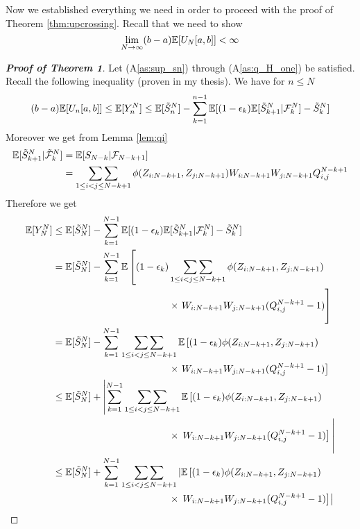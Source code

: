 %
\noindent Now we established everything we need in order to proceed with the proof of Theorem \ref{thm:upcrossing}. Recall that we need to show 
\begin{equation*}
	\lim\limits_{N\to\infty}(b-a) \mathbb{E}[U_N[a,b]] <\infty\nonumber
\end{equation*}
%
\begin{proof}[\textbf{Proof of Theorem 1}]
	Let (A\ref{as:sup_sn}) through (A\ref{as:q_H_one}) be satisfied. Recall the following inequality (proven in my thesis). We have for $n\leq N$
	$$(b-a) \mathbb{E}[U_n[a,b]] \leq \mathbb{E}[Y_n^N] \leq \mathbb{E}[\tilde{S}_{n}^N] - \sum_{k=1}^{n-1} \mathbb{E}[(1-\epsilon_k) \mathbb{E}[\tilde{S}_{k+1}^N | \mathcal{F}_k^N] - \tilde{S}_{k}^N]$$
	Moreover we get from Lemma \ref{lem:qi}
	\begin{align*}
	\mathbb{E}[\tilde{S}_{k+1}^N|\tilde{\mathcal{F}}_{k}^N] &= \mathbb{E}[S_{N-k} | \mathcal{F}_{N-k+1}]\\
	&= \mathop{\sum\sum}\limits_{1\leq i<j\leq N-k+1} \phi(Z_{i:N-k+1}, Z_{j:N-k+1}) W_{i:N-k+1} W_{j:N-k+1} Q_{i,j}^{N-k+1}
	\end{align*}
	Therefore we get
	\begin{align*}
		\E[Y_N^N] &\leq \E[\StN{N}] - \sum_{k=1}^{N-1} \E[(1-\epsilon_k) \E[\StN{k+1} | \F_k^N] - \StN{k} ]\\
		&=  \E[\StN{N}] - \sum_{k=1}^{N-1} \E\left[(1-\epsilon_k) \doublesum\limits_{1\leq i<j\leq N-k+1} \phi(Z_{i:N-k+1}, Z_{j:N-k+1}) \right. \\
		&\qquad\qquad\qquad\qquad\qquad\qquad \times \left. W_{i:N-k+1} W_{j:N-k+1}(Q_{i,j}^{N-k+1} - 1) \vphantom{\doublesum\limits_{1\leq i<j\leq N-k+1}}\right]\\
		&=  \E[\StN{N}] - \sum_{k=1}^{N-1} \doublesum\limits_{1\leq i<j\leq N-k+1} \E\left[(1-\epsilon_k)\phi(Z_{i:N-k+1}, Z_{j:N-k+1}) \right. \\
		&\qquad\qquad\qquad\qquad\qquad\qquad \times \left. W_{i:N-k+1} W_{j:N-k+1}(Q_{i,j}^{N-k+1} - 1) \right]\\
		&\leq  \E[\StN{N}] + \left|\sum_{k=1}^{N-1} \doublesum\limits_{1\leq i<j\leq N-k+1} \E\left[(1-\epsilon_k)\phi(Z_{i:N-k+1}, Z_{j:N-k+1}) \right.\right. \\
		&\qquad\qquad\qquad\qquad\qquad\qquad \times \left.\left. W_{i:N-k+1} W_{j:N-k+1}(Q_{i,j}^{N-k+1} - 1) \right]\vphantom{\doublesum\limits_{1\leq i<j\leq N-k+1}}\right|\\
		&\leq  \E[\StN{N}] + \sum_{k=1}^{N-1} \doublesum\limits_{1\leq i<j\leq N-k+1} \left|\E\left[(1-\epsilon_k)\phi(Z_{i:N-k+1}, Z_{j:N-k+1}) \right.\right. \\
		&\qquad\qquad\qquad\qquad\qquad\qquad \times \left.\left. W_{i:N-k+1} W_{j:N-k+1}(Q_{i,j}^{N-k+1} - 1) \right]\right|

\end{align*}
\end{proof}
